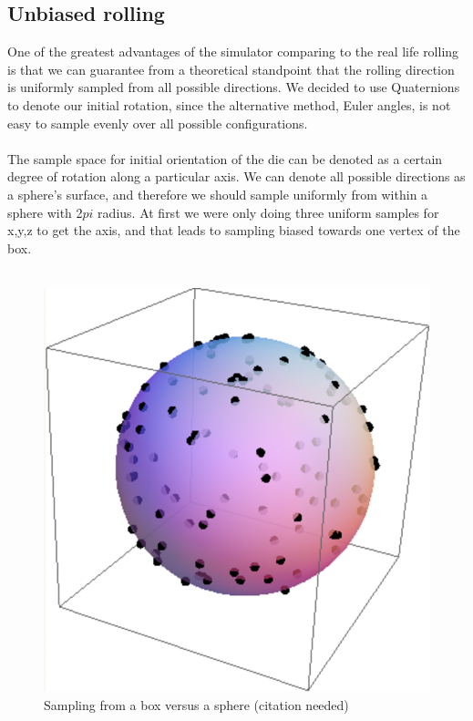 \subsection{Unbiased rolling}
One of the greatest advantages of the simulator comparing to the real life rolling is that we can guarantee from a theoretical standpoint that the rolling direction is uniformly sampled from all possible directions. We decided to use Quaternions to denote our initial rotation, since the alternative method, Euler angles, is not easy to sample evenly over all possible configurations. \\\\
The sample space for initial orientation of the die can be denoted as a certain degree of rotation along a particular axis. We can denote all possible directions as a sphere's surface, and therefore we should sample uniformly from within a sphere with 2${pi}$ radius. At first we were only doing three uniform samples for x,y,z to get the axis, and that leads to sampling biased towards one vertex of the box.\\\\
\begin{figure}[h]
\center
\includegraphics[scale=0.5]{sphereInAbox.png}
\caption{Sampling from a box versus a sphere (citation needed)}
\label{fig:square_p}
\end{figure}\\\\
